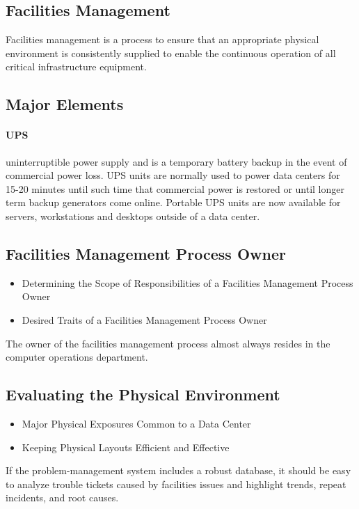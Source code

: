 \documentclass[a4]{article}
\begin{document}
\begin{multicols}{3}
\section{Facilities Management}
Facilities management is a process to ensure that an appropriate physical environment is consistently supplied to 
enable the continuous operation of all critical infrastructure equipment.
\subsection{Major Elements}
\paragraph{UPS} uninterruptible power supply and is a temporary battery backup in the event of commercial power loss.
UPS units are normally used to power data centers for 15-20 minutes until such time that commercial power is restored 
or until longer term backup generators come online. 
Portable UPS units are now available for servers, workstations and desktops outside of a data center.

\subsection{Facilities Management Process Owner}
\begin{itemize}
    \item Determining the Scope of Responsibilities of a Facilities Management Process Owner
    \item Desired Traits of a Facilities Management Process Owner
\end{itemize}
The owner of the facilities management process almost always resides in the computer operations department.

\subsection{Evaluating the Physical Environment}
\begin{itemize}
    \item Major Physical Exposures Common to a Data Center
    \item Keeping Physical Layouts Efficient and Effective
\end{itemize}
If the problem-management system includes a robust database, it should be easy to analyze trouble tickets caused by 
facilities issues and highlight trends, repeat incidents, and root causes.


\end{multicols}
\end{document}
